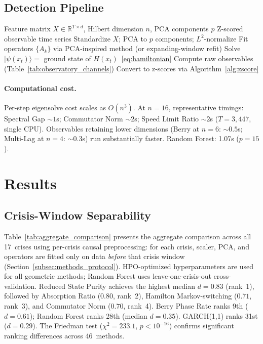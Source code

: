 \documentclass[3p]{elsarticle}
\newcommand{\ket}[1]{|#1\rangle}
\newcommand{\R}{\mathbb{R}}
\begin{document}
\subsection{Detection Pipeline}\label{subsec:pipeline}

\begin{algorithm}[htb]
\caption{QCML Geometric Regime Detection}\label{alg:detection}
\begin{algorithmic}[1]
\Require Feature matrix $X \in \R^{T \times d}$, Hilbert dimension
  $n$, PCA components $p$
\Ensure Z-scored observable time series
\State Standardize $X$; PCA to $p$ components; $L^2$-normalize
\State Fit operators $\{A_k\}$ via PCA-inspired method
  (or expanding-window refit)
  \State Solve $\ket{\psi(x_t)} = $ ground state of
    $H(x_t)$~\eqref{eq:hamiltonian}
  \State Compute raw observables (Table~\ref{tab:observatory_channels})
\EndFor
\State Convert to z-scores via Algorithm~\ref{alg:zscore}
\end{algorithmic}
\end{algorithm}

\paragraph{Computational cost.}
Per-step eigensolve cost scales as $O(n^3)$.  At $n = 16$,
representative timings: Spectral Gap ${\sim}1$s; Commutator Norm
${\sim}2$s; Speed Limit Ratio ${\sim}2$s ($T = 3{,}447$, single CPU).
Observables retaining lower dimensions (Berry at $n = 6$: ${\sim}0.5$s;
Multi-Lag at $n = 4$: ${\sim}0.3$s) run substantially faster.
Random Forest: 1.07s ($p = 15$).

\section{Results}\label{sec:results}

\subsection{Crisis-Window Separability}\label{subsec:separability}

Table~\ref{tab:aggregate_comparison} presents the aggregate comparison
across all 17~crises using per-crisis causal preprocessing: for each
crisis, scaler, PCA, and operators are fitted only on data
\emph{before} that crisis window
(Section~\ref{subsec:methods_protocol}).  HPO-optimized
hyperparameters are used for all geometric methods; Random Forest uses
leave-one-crisis-out cross-validation.
Reduced State Purity achieves the highest median $d = 0.83$ (rank~1),
followed by Absorption Ratio ($0.80$, rank~2), Hamilton
Markov-switching ($0.71$, rank~3), and Commutator Norm ($0.70$, rank~4).
Berry Phase Rate ranks 9th ($d = 0.61$); Random Forest ranks 28th
(median $d = 0.35$).  GARCH(1,1) ranks 31st ($d = 0.29$).
The Friedman test ($\chi^2 = 233.1$, $p < 10^{-16}$)
confirms significant ranking differences across 46~methods.
\end{document}
